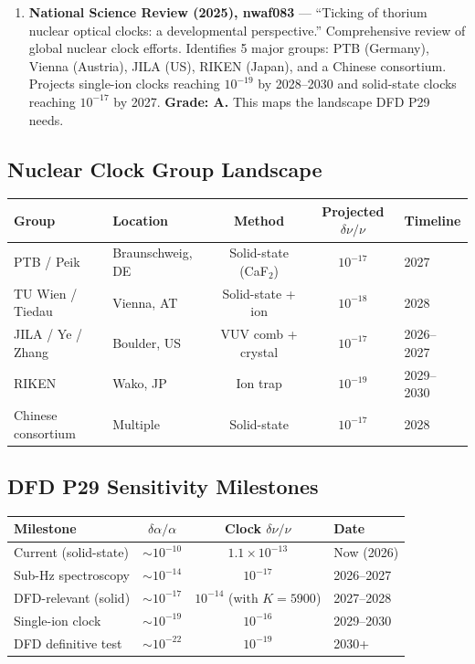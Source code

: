 \documentclass[11pt,a4paper]{article}
\begin{document}
\begin{enumerate}
\item \textbf{National Science Review (2025), nwaf083} --- ``Ticking of thorium nuclear optical clocks: a developmental perspective.'' Comprehensive review of global nuclear clock efforts. Identifies 5 major groups: PTB (Germany), Vienna (Austria), JILA (US), RIKEN (Japan), and a Chinese consortium. Projects single-ion clocks reaching $10^{-19}$ by 2028--2030 and solid-state clocks reaching $10^{-17}$ by 2027. \textbf{Grade: A.} This maps the landscape DFD P29 needs.

\end{enumerate}

\subsection{Nuclear Clock Group Landscape}

\begin{center}
\begin{longtable}{llccl}
\toprule
\textbf{Group} & \textbf{Location} & \textbf{Method} & \textbf{Projected $\delta\nu/\nu$} & \textbf{Timeline} \\
\midrule
\endhead
PTB / Peik & Braunschweig, DE & Solid-state (CaF$_2$) & $10^{-17}$ & 2027 \\
TU Wien / Tiedau & Vienna, AT & Solid-state + ion & $10^{-18}$ & 2028 \\
JILA / Ye / Zhang & Boulder, US & VUV comb + crystal & $10^{-17}$ & 2026--2027 \\
RIKEN & Wako, JP & Ion trap & $10^{-19}$ & 2029--2030 \\
Chinese consortium & Multiple & Solid-state & $10^{-17}$ & 2028 \\
\bottomrule
\end{longtable}
\end{center}

\subsection{DFD P29 Sensitivity Milestones}

\begin{center}
\begin{tabular}{lccl}
\toprule
\textbf{Milestone} & \textbf{$\delta\alpha/\alpha$} & \textbf{Clock $\delta\nu/\nu$} & \textbf{Date} \\
\midrule
Current (solid-state) & $\sim 10^{-10}$ & $1.1 \times 10^{-13}$ & Now (2026) \\
Sub-Hz spectroscopy & $\sim 10^{-14}$ & $10^{-17}$ & 2026--2027 \\
DFD-relevant (solid) & $\sim 10^{-17}$ & $10^{-14}$ (with $K = 5900$) & 2027--2028 \\
Single-ion clock & $\sim 10^{-19}$ & $10^{-16}$ & 2029--2030 \\
DFD definitive test & $\sim 10^{-22}$ & $10^{-19}$ & 2030+ \\
\bottomrule
\end{tabular}
\end{center}
\end{document}
